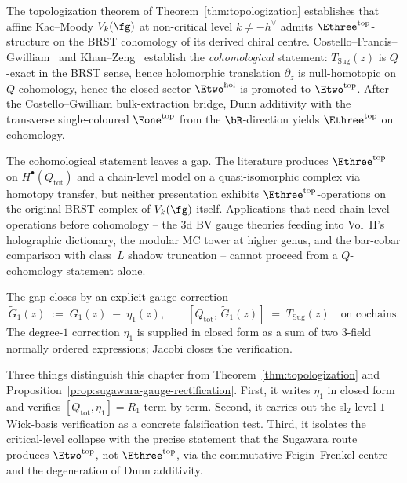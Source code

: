 The topologization theorem of
Theorem~\ref{thm:topologization} establishes that affine
Kac--Moody $V_k(\fg)$ at non-critical level $k \ne -h^\vee$ admits
$\Ethree^{\mathrm{top}}$-structure on the BRST cohomology of its
derived chiral centre. Costello--Francis--Gwilliam~\cite{CFG2602}
and Khan--Zeng~\cite{KhanZeng25} establish the \emph{cohomological}
statement: $T_{\mathrm{Sug}}(z)$ is $Q$-exact in the BRST sense,
hence holomorphic translation $\partial_z$ is null-homotopic on
$Q$-cohomology, hence the closed-sector $\Etwo^{\mathrm{hol}}$ is
promoted to $\Etwo^{\mathrm{top}}$. After the
Costello--Gwilliam bulk-extraction bridge, Dunn additivity with the
transverse single-coloured $\Eone^{\mathrm{top}}$ from the
$\bR$-direction yields $\Ethree^{\mathrm{top}}$ on cohomology.

The cohomological statement leaves a gap. The literature produces
$\Ethree^{\mathrm{top}}$ on $H^\bullet(Q_{\mathrm{tot}})$ and a
chain-level model on a quasi-isomorphic complex via homotopy
transfer, but neither presentation exhibits
$\Ethree^{\mathrm{top}}$-operations on the original BRST complex
of $V_k(\fg)$ itself. Applications that need chain-level operations
before cohomology -- the $3$d BV gauge theories feeding into
Vol~II's holographic dictionary, the modular MC tower at higher
genus, and the bar-cobar comparison with class~$L$ shadow truncation
-- cannot proceed from a $Q$-cohomology statement alone.

The gap closes by an explicit gauge correction
\begin{equation}\label{eq:strict-identity-overview}
 \widetilde G_1(z) \;:=\; G_1(z) \;-\; \eta_1(z),
 \qquad
 [Q_{\mathrm{tot}},\,\widetilde G_1(z)]
 \;=\; T_{\mathrm{Sug}}(z)
 \quad\text{on cochains.}
\end{equation}
The degree-$1$ correction $\eta_1$ is supplied in closed form as a
sum of two $3$-field normally ordered expressions;
Jacobi closes the verification.

Three things distinguish this chapter from
Theorem~\ref{thm:topologization} and
Proposition~\ref{prop:sugawara-gauge-rectification}.
First, it writes $\eta_1$ in closed form and verifies
$[Q_{\mathrm{tot}},\eta_1] = R_1$ term by term. Second, it
carries out the sl$_2$ level-$1$ Wick-basis verification as a
concrete falsification test. Third, it isolates the
critical-level collapse with the precise statement that the
Sugawara route produces $\Etwo^{\mathrm{top}}$, not
$\Ethree^{\mathrm{top}}$, via the commutative Feigin--Frenkel
centre and the degeneration of Dunn additivity.

